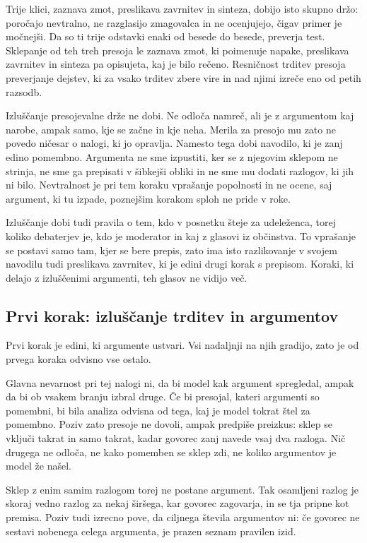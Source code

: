 \documentclass[a4paper, 12pt]{book}
\begin{document}
Trije klici, zaznava zmot, preslikava zavrnitev in sinteza, dobijo isto skupno
držo: poročajo nevtralno, ne razglasijo zmagovalca in ne ocenjujejo, čigav
primer je močnejši. Da so ti trije odstavki enaki od besede do besede, preverja
test. Sklepanje od teh treh presoja le zaznava zmot, ki poimenuje napake,
preslikava zavrnitev in sinteza pa opisujeta, kaj je bilo rečeno. Resničnost
trditev presoja preverjanje dejstev, ki za vsako trditev zbere vire in nad njimi
izreče eno od petih razsodb. 

Izluščanje presojevalne drže ne dobi. Ne odloča namreč, ali je z argumentom kaj
narobe, ampak samo, kje se začne in kje neha. Merila za presojo mu zato ne
povedo ničesar o nalogi, ki jo opravlja. Namesto tega dobi navodilo, ki je zanj
edino pomembno. Argumenta ne sme izpustiti, ker se z njegovim sklepom ne
strinja, ne sme ga prepisati v šibkejši obliki in ne sme mu dodati razlogov, ki
jih ni bilo. Nevtralnost je pri tem koraku vprašanje popolnosti in ne ocene, saj
argument, ki tu izpade, poznejšim korakom sploh ne pride v roke.

Izluščanje dobi tudi pravila o tem, kdo v posnetku šteje za udeleženca, torej
koliko debaterjev je, kdo je moderator in kaj z glasovi iz občinstva. To
vprašanje se postavi samo tam, kjer se bere prepis, zato ima isto razlikovanje v
svojem navodilu tudi preslikava zavrnitev, ki je edini drugi korak s prepisom.
Koraki, ki delajo z izluščenimi argumenti, teh glasov ne vidijo več.

\subsection{Prvi korak: izluščanje trditev in argumentov}
\label{ssec:prehod1}

Prvi korak je edini, ki argumente ustvari. Vsi nadaljnji na njih gradijo, zato
je od prvega koraka odvisno vse ostalo.

Glavna nevarnost pri tej nalogi ni, da bi model kak argument spregledal, ampak
da bi ob vsakem branju izbral druge. Če bi presojal, kateri argumenti so
pomembni, bi bila analiza odvisna od tega, kaj je model tokrat štel za
pomembno. Poziv zato presoje ne dovoli, ampak predpiše preizkus: sklep se vključi takrat in samo takrat, kadar govorec zanj navede vsaj dva razloga. Nič drugega ne odloča, ne kako pomemben se sklep zdi, ne koliko argumentov je model že našel.

Sklep z enim samim razlogom torej ne postane argument. Tak osamljeni razlog je
skoraj vedno razlog za nekaj širšega, kar govorec zagovarja, in se tja pripne
kot premisa. Poziv tudi izrecno pove, da ciljnega števila argumentov ni: če
govorec ne sestavi nobenega celega argumenta, je prazen seznam pravilen izid.
\end{document}
